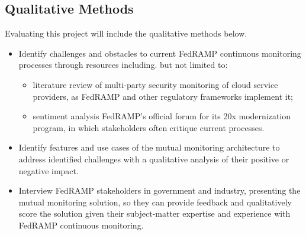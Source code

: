 \documentclass{jdf}
\begin{document}
\subsection*{Qualitative Methods}

Evaluating this project will include the qualitative methods below.

\begin{itemize}
  \item Identify challenges and obstacles to current FedRAMP continuous monitoring processes through resources including. but not limited to:
  \begin{itemize}
    \item literature review of multi-party security monitoring of cloud service providers, as FedRAMP and other regulatory frameworks implement it;
    \item sentiment analysis FedRAMP's official forum for its 20x modernization program, in which stakeholders often critique current processes.
  \end{itemize}
  \item Identify features and use cases of the mutual monitoring architecture to address identified challenges with a qualitative analysis of their positive or negative impact.
  \item Interview FedRAMP stakeholders in government and industry, presenting the mutual monitoring solution, so they can provide feedback and qualitatively score the solution given their subject-matter expertise and experience with FedRAMP continuous monitoring.
\end{itemize}
\end{document}
